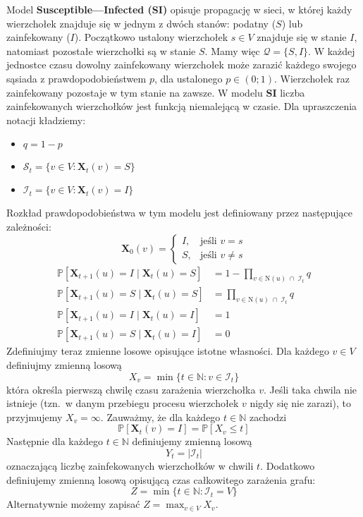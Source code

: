 Model \textbf{Susceptible—Infected (SI)} opisuje propagację w sieci, w której każdy wierzchołek znajduje się w jednym z dwóch stanów: podatny ($S$) lub zainfekowany ($I$).  
Początkowo ustalony wierzchołek $s \in V$ znajduje się w stanie $I$, natomiast pozostałe wierzchołki są w stanie $S$. Mamy więc $\mathcal{Q} = \{S, I\}$.
W każdej jednostce czasu dowolny zainfekowany wierzchołek może zarazić każdego swojego sąsiada z prawdopodobieństwem $p$, dla ustalonego $p \in (0;1)$.  
Wierzchołek raz zainfekowany pozostaje w tym stanie na zawsze.  
W modelu \textbf{SI} liczba zainfekowanych wierzchołków jest funkcją niemalejącą w czasie.
Dla upraszczenia notacji kładziemy: 
\begin{itemize}
    \item $q=1-p$
    \item $\mathcal{S}_t=\{v\in V: \mathbf{X}_t(v) = S\}$
    \item $\mathcal{I}_t=\{v\in V: \mathbf{X}_t(v) = I\}$
\end{itemize}
Rozkład prawdopodobieństwa w tym modelu jest definiowany przez następujące zależności:
\[
\mathbf{X}_0(v) =
\begin{cases}
I, & \text{jeśli } v = s \\[4pt]
S, & \text{jeśli } v \neq s
\end{cases}
\]
\[
\begin{aligned}
\mathbb{P}[\mathbf{X}_{t+1}(u) = I \mid \mathbf{X}_t(u) = S]
 &= 1 - \prod_{v \in \mathrm{N}(u) \;\cap\; \mathcal{I}_t} q \\[6pt]
\mathbb{P}[\mathbf{X}_{t+1}(u) = S \mid \mathbf{X}_t(u) = S]
 &= \prod_{v \in \mathrm{N}(u) \;\cap\; \mathcal{I}_t} q \\[6pt]
\mathbb{P}[\mathbf{X}_{t+1}(u) = I \mid \mathbf{X}_t(u) = I]
 &= 1 \\[6pt]
\mathbb{P}[\mathbf{X}_{t+1}(u) = S \mid \mathbf{X}_t(u) = I]
 &= 0
\end{aligned}
\]
Zdefiniujmy teraz zmienne losowe opisujące istotne własności.
Dla każdego $v \in V$ definiujmy zmienną losową
\[
X_v = \min \{ t \in \mathbb{N} : v \in \mathcal{I}_t \}
\]
która określa pierwszą chwilę czasu zarażenia wierzchołka $v$.
Jeśli taka chwila nie istnieje (tzn.\ w danym przebiegu procesu wierzchołek $v$ nigdy się nie zarazi), to przyjmujemy $X_v = \infty$.
Zauważmy, że dla każdego $t \in \mathbb{N}$ zachodzi 
\[
    \mathbb{P}[\mathbf{X}_t(v) = I] = \mathbb{P}[X_v \le t]
\]
Następnie dla każdego $t\in\mathbb{N}$ definiujemy zmienną losową 
\[
    Y_t = |\mathcal{I}_t|
\]
oznaczającą liczbę zainfekowanych wierzchołków w chwili $t$. Dodatkowo definiujemy zmienną losową opisującą czas całkowitego zarażenia grafu:
\[
    Z = \min \{ t \in \mathbb{N} : \mathcal{I}_t = V\}
\]
Alternatywnie możemy zapisać $Z = \max_{v \in V} X_v$.


